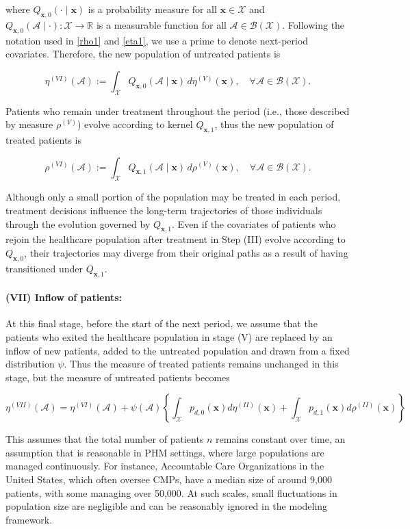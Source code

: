 \documentclass[12pt,a4paper]{article}
\newcommand{\bx}{\mathbf{x}}
\newcommand{\mA}{\mathcal{A}}
\newcommand{\mX}{\mathcal{X}}
\newcommand{\mBX}{ \mathcal{B}(\mathcal{X})}
\begin{document}
\noindent where $Q_{\bx,0}(\cdot \mid \bx)$ is a probability measure for all $\bx \in \mX$ and $Q_{\bx,0}(\mathcal{A} \mid \cdot) : \mathcal{X} \rightarrow \mathbb{R}$ is a measurable function for all $\mA \in \mBX$. Following the notation used in \eqref{rho1} and \eqref{eta1}, we use a prime to denote next-period covariates. Therefore, the new population of untreated patients is

$$
\eta^{(VI)}(\mathcal{A}) := \int_{\mathcal{X}} Q_{\bx,0}(\mA \mid \bx) \, d\eta^{(V)}(\bx), \quad \forall \mathcal{A} \in \mathcal{B}(\mathcal{X}).
$$

Patients who remain under treatment throughout the period (i.e., those described by measure $\rho^{(V)}$) evolve according to kernel $Q_{\bx,1}$, thus the new population of treated patients is

$$
\rho^{(VI)}(\mathcal{A}) := \int_{\mathcal{X}} Q_{\bx,1}(\mA \mid \bx) \, d\rho^{(V)}(\bx), \quad \forall \mathcal{A} \in \mathcal{B}(\mathcal{X}).
$$


Although only a small portion of the population may be treated in each period, treatment decisions influence the long-term trajectories of those individuals through the evolution governed by $Q_{\bx,1}$. Even if the covariates of patients who rejoin the healthcare population after treatment in Step (III) evolve according to $Q_{\bx,0}$, their trajectories  may diverge from their original paths as a result of having transitioned under \( Q_{\bx,1} \).




\paragraph{\bf (VII) Inflow of patients:}
At this final stage, before the start of the next period, we assume that the patients who exited the healthcare population in stage (V) are replaced by an inflow of new patients, added to the untreated population and drawn from a fixed distribution $\psi$. Thus the measure of treated patients remains unchanged in this stage, but the measure of untreated patients becomes

$$\eta^{(VII)}(\mA)=\eta^{(VI)}(\mA)+\psi(\mA) \left\{ \int_{\mX} p_{d,0}(\bx)d\eta^{(II)}(\bx)+ \int_{\mX} p_{d,1}(\bx)d\rho^{(II)}(\bx)\right\}$$


This assumes that the total number of patients $n$ remains constant over time, an assumption that is reasonable in PHM settings, where large populations are managed continuously. For instance, Accountable Care Organizations in the United States, which often oversee CMPs, have a median size of around 9,000 patients, with some managing over 50,000. At such scales, small fluctuations in population size are negligible and can be reasonably ignored in the modeling framework.
\end{document}
